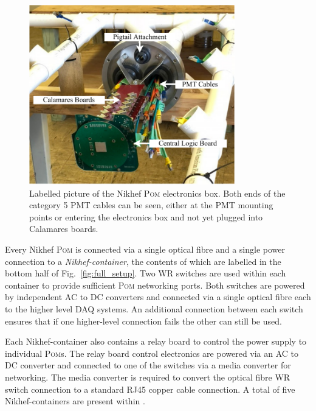 \begin{figure} %
    \includegraphics[width=0.8\textwidth]{diagrams/5-daq/nikhef_plane.pdf}
    \caption[Labelled picture of the Nikhef \textsc{Pom} electronics box.]
    {Labelled picture of the Nikhef \textsc{Pom} electronics box. Both ends of the category 5 PMT
        cables can be seen, either at the PMT mounting points or entering the electronics box and
        not yet plugged into Calamares boards.}
    \label{fig:nikhef_plane}
\end{figure}

Every Nikhef \textsc{Pom} is connected via a single optical fibre and a single power connection to
a \emph{Nikhef-container}, the contents of which are labelled in the bottom half of
Fig.~\ref{fig:full_setup}. Two WR switches are used within each container to provide sufficient
\textsc{Pom} networking ports. Both switches are powered by independent AC to DC converters and
connected via a single optical fibre each to the higher level DAQ systems. An additional
connection between each switch ensures that if one higher-level connection fails the other can
still be used.

Each Nikhef-container also contains a relay board to control the power supply to individual
\textsc{Pom}s. The relay board control electronics are powered via an AC to DC converter and
connected to one of the switches via a media converter for networking. The media converter is
required to convert the optical fibre WR switch connection to a standard RJ45 copper cable
connection. A total of five Nikhef-containers are present within \chipsfive.

